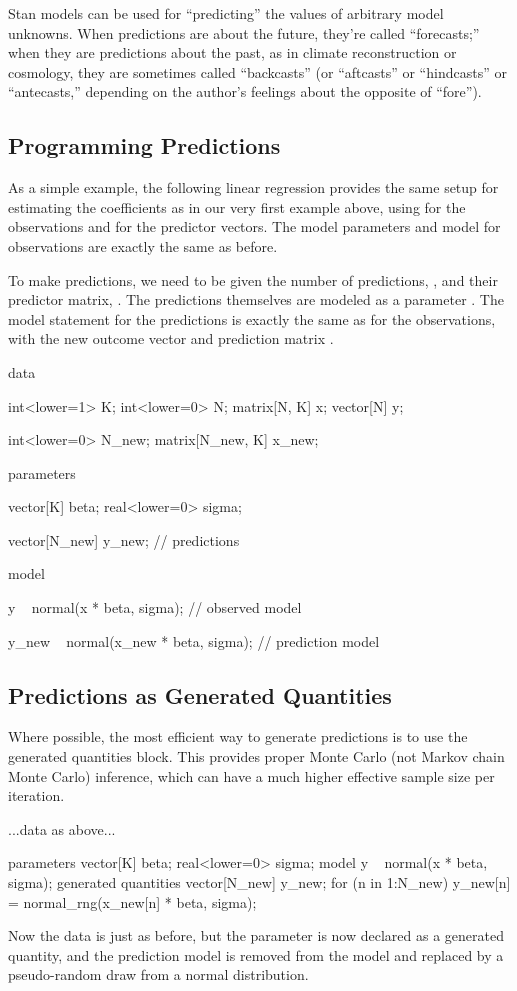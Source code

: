 Stan models can be used for ``predicting'' the values of arbitrary
model unknowns.  When predictions are about the future, they're called
``forecasts;'' when they are predictions about the past, as in climate
reconstruction or cosmology, they are sometimes called ``backcasts''
(or ``aftcasts'' or ``hindcasts'' or ``antecasts,'' depending on the
author's feelings about the opposite of ``fore'').

\subsection{Programming Predictions}

As a simple example, the following linear regression provides the same
setup for estimating the coefficients  as in our very first
example above, using  for the  observations and
 for the  predictor vectors.  The model parameters and
model for observations are exactly the same as before.

To make predictions, we need to be given the number of predictions,
, and their predictor matrix, .  The
predictions themselves are modeled as a parameter .  The
model statement for the predictions is exactly the same as for the
observations, with the new outcome vector  and prediction
matrix .
%
\begin{stancode}
data {
  int<lower=1> K;
  int<lower=0> N;
  matrix[N, K] x;       
  vector[N] y;     

  int<lower=0> N_new;
  matrix[N_new, K] x_new; 
}
parameters {
  vector[K] beta;
  real<lower=0> sigma;

  vector[N_new] y_new;                  // predictions
}
model {
  y ~ normal(x * beta, sigma);          // observed model

  y_new ~ normal(x_new * beta, sigma);  // prediction model
}
\end{stancode}


\subsection{Predictions as Generated Quantities}

Where possible, the most efficient way to generate predictions is to
use the generated quantities block.  This provides proper Monte Carlo
(not Markov chain Monte Carlo) inference, which can have a much higher
effective sample size per iteration.
%
\begin{stancode}
...data as above...

parameters {
  vector[K] beta;
  real<lower=0> sigma;
}
model {
  y ~ normal(x * beta, sigma);         
}
generated quantities {
  vector[N_new] y_new;  
  for (n in 1:N_new)
    y_new[n] = normal_rng(x_new[n] * beta, sigma);
}
\end{stancode}
%
Now the data is just as before, but the parameter  is now
declared as a generated quantity, and the prediction model is
removed from the model and replaced by a pseudo-random draw from a
normal distribution.

